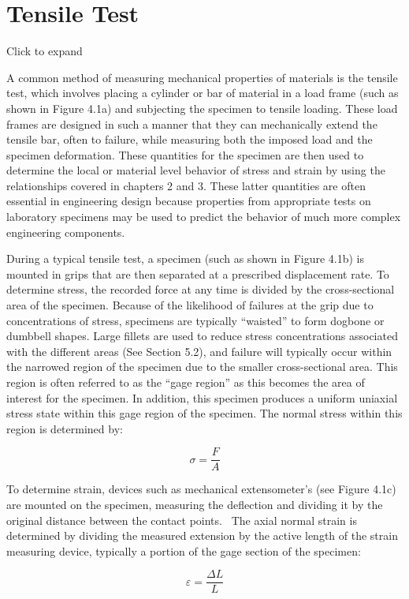 \documentclass[
  letterpaper,
  DIV=11,
  numbers=noendperiod]{scrreprt}
\begin{document}
\section{Tensile Test}\label{sec-4.1}

Click to expand

A common method of measuring mechanical properties of materials is the
tensile test, which involves placing a cylinder or bar of material in a
load frame (such as shown in Figure 4.1a) and subjecting the specimen to
tensile loading. These load frames are designed in such a manner that
they can mechanically extend the tensile bar, often to failure, while
measuring both the imposed load and the specimen deformation. These
quantities for the specimen are then used to determine the local or
material level behavior of stress and strain by using the relationships
covered in chapters 2 and 3. These latter quantities are often essential
in engineering design because properties from appropriate tests on
laboratory specimens may be used to predict the behavior of much more
complex engineering components.

During a typical tensile test, a specimen (such as shown in Figure 4.1b)
is mounted in grips that are then separated at a prescribed displacement
rate. To determine stress, the recorded force at any time is divided by
the cross-sectional area of the specimen. Because of the likelihood of
failures at the grip due to concentrations of stress, specimens are
typically ``waisted'' to form dogbone or dumbbell shapes. Large fillets
are used to reduce stress concentrations associated with the different
areas (See Section 5.2), and failure will typically occur within the
narrowed region of the specimen due to the smaller cross-sectional area.
This region is often referred to as the ``gage region'' as this becomes
the area of interest for the specimen. In addition, this specimen
produces a uniform uniaxial stress state within this gage region of the
specimen. The normal stress within this region is determined by:

\[
\sigma=\frac{F}{A}
\]

To determine strain, devices such as mechanical extensometer's (see
Figure 4.1c) are mounted on the specimen, measuring the deflection and
dividing it by the original distance between the contact points.~ The
axial normal strain is determined by dividing the measured extension by
the active length of the strain measuring device, typically a portion of
the gage section of the specimen:

\[
\varepsilon=\frac{\Delta L}{L}
\]
\end{document}
